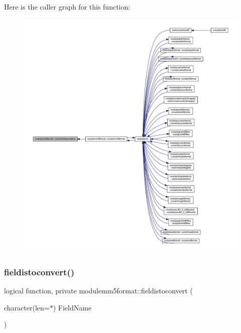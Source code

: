 Here is the caller graph for this function\+:\nopagebreak
\begin{figure}[H]
\begin{center}
\leavevmode
\includegraphics[width=350pt]{namespacemodulemm5format_aecf73e96a833b95d469c3682bf5df737_icgraph}
\end{center}
\end{figure}
\mbox{\label{namespacemodulemm5format_a06df0a4d83e5c07c6427f1e426280250}} 
\subsubsection{\texorpdfstring{fieldistoconvert()}{fieldistoconvert()}}
{\footnotesize\ttfamily logical function, private modulemm5format\+::fieldistoconvert (\begin{DoxyParamCaption}\item[{character(len=$\ast$)}]{Field\+Name }\end{DoxyParamCaption})\hspace{0.3cm}{\ttfamily [private]}}

